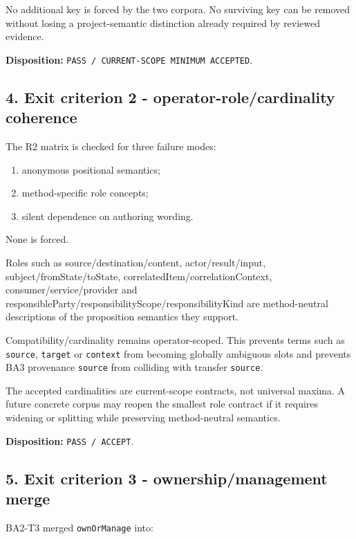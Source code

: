 \documentclass[11pt,a4paper]{article}
\providecommand{\tightlist}{\setlength{\itemsep}{0pt}\setlength{\parskip}{0pt}}
\begin{document}
No additional key is forced by the two corpora. No surviving key can be removed without losing a project-semantic distinction already required by reviewed evidence.

\textbf{Disposition:} \texttt{PASS\ /\ CURRENT-SCOPE\ MINIMUM\ ACCEPTED}.

\subsection{4. Exit criterion 2 - operator-role/cardinality coherence}\label{exit-criterion-2---operator-rolecardinality-coherence}

The R2 matrix is checked for three failure modes:

\begin{enumerate}
\def\labelenumi{\arabic{enumi}.}
\tightlist
\item
  anonymous positional semantics;
\item
  method-specific role concepts;
\item
  silent dependence on authoring wording.
\end{enumerate}

None is forced.

Roles such as source/destination/content, actor/result/input, subject/fromState/toState, correlatedItem/correlationContext, consumer/service/provider and responsibleParty/responsibilityScope/responsibilityKind are method-neutral descriptions of the proposition semantics they support.

Compatibility/cardinality remains operator-scoped. This prevents terms such as \texttt{source}, \texttt{target} or \texttt{context} from becoming globally ambiguous slots and prevents BA3 provenance \texttt{source} from colliding with transfer \texttt{source}.

The accepted cardinalities are current-scope contracts, not universal maxima. A future concrete corpus may reopen the smallest role contract if it requires widening or splitting while preserving method-neutral semantics.

\textbf{Disposition:} \texttt{PASS\ /\ ACCEPT}.

\subsection{5. Exit criterion 3 - ownership/management merge}\label{exit-criterion-3---ownershipmanagement-merge}

BA2-T3 merged \texttt{ownOrManage} into:
\end{document}
